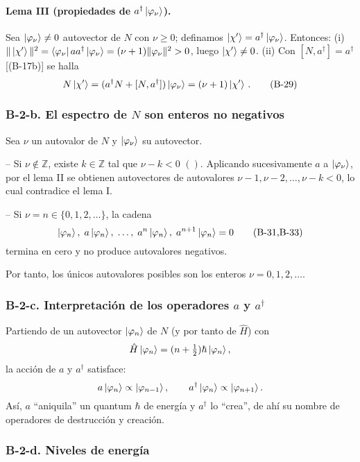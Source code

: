\documentclass[a4paper,11pt]{article}
\begin{document}
\paragraph{Lema III (propiedades de \(a^\dagger\ket{\varphi_\nu}\)).}  
Sea \(\ket{\varphi_\nu}\ne0\) autovector de \(N\) con \(\nu\ge0\); definamos  
\(\ket{\chi'}=a^\dagger\ket{\varphi_\nu}\). Entonces:  
(i) \(\|\ket{\chi'}\|^2=\bra{\varphi_\nu}aa^\dagger\ket{\varphi_\nu}
=(\nu+1)\|\varphi_\nu\|^2>0\), luego \(\ket{\chi'}\ne0\).  
(ii) Con \([N,a^\dagger]=a^\dagger\) [(B-17b)] se halla
\[
N\ket{\chi'}
=(a^\dagger N+[N,a^\dagger])\ket{\varphi_\nu}
=(\nu+1)\ket{\chi'}\,.
\tag{B-29}
\]

\subsubsection*{B-2-b. El espectro de \(N\) son enteros no negativos}

Sea \(\nu\) un autovalor de \(N\) y \(\ket{\varphi_\nu}\) su autovector.  

– Si \(\nu\notin\mathbb{Z}\), existe \(k\in\mathbb{Z}\) tal que  
\(\nu-k<0\)  \((\!)\).  
Aplicando sucesivamente \(a\) a \(\ket{\varphi_\nu}\), por el lema II se obtienen autovectores de autovalores \(\nu-1,\nu-2,\dots,\nu-k<0\), lo cual contradice el lema I.  

– Si \(\nu=n\in\{0,1,2,\dots\}\), la cadena  
\[
\ket{\varphi_n},\;a\ket{\varphi_n},\;\dots,\;a^n\ket{\varphi_n},\;
a^{n+1}\ket{\varphi_n}=0
\tag{B-31,B-33}
\]
termina en cero y no produce autovalores negativos.  

Por tanto, los únicos autovalores posibles son los enteros \(\nu=0,1,2,\dots\).

\subsubsection*{B-2-c. Interpretación de los operadores \(a\) y \(a^\dagger\)}

Partiendo de un autovector \(\ket{\varphi_n}\) de \(N\) (y por tanto de \(\hat H\)) con  
\[
\hat H\ket{\varphi_n}=(n+\tfrac12)\hbar\ket{\varphi_n},
\]
la acción de \(a\) y \(a^\dagger\) satisface:
\[
a\ket{\varphi_n}\propto\ket{\varphi_{n-1}},\qquad
a^\dagger\ket{\varphi_n}\propto\ket{\varphi_{n+1}}.
\]
Así, \(a\) “aniquila” un quantum \(\hbar\) de energía y \(a^\dagger\) lo “crea”, de ahí su nombre de operadores de destrucción y creación.

\subsubsection*{B-2-d. Niveles de energía}
\end{document}
